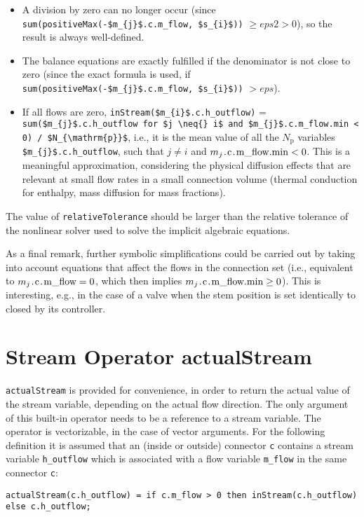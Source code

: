 \begin{nonnormative}
\begin{itemize}
\item
  A division by zero can no longer occur (since \lstinline[mathescape=true]!sum(positiveMax(-$m_{j}$.c.m_flow, $s_{i}$))! $\geq \mathit{eps2} > 0$),
  so the result is always well-defined.
\item
  The balance equations are exactly fulfilled if the denominator is not close to zero (since the exact formula is used, if
  \lstinline[mathescape=true]!sum(positiveMax(-$m_{j}$.c.m_flow, $s_{i}$))! $> \mathit{eps}$).
\item
  If all flows are zero,
  \lstinline[mathescape=true]!inStream($m_{i}$.c.h_outflow)! =
  \lstinline[mathescape=true]!sum($m_{j}$.c.h_outflow for $j \neq{} i$ and $m_{j}$.c.m_flow.min < 0) / $N_{\mathrm{p}}$!,
  i.e., it is the mean value of all the $N_{\mathrm{p}}$ variables
  \lstinline[mathescape=true]!$m_{j}$.c.h_outflow!, such that $j \neq i$ and
  $m_{j}\text{\lstinline!.c.m_flow.min!} < 0$. This is a
  meaningful approximation, considering the physical diffusion effects
  that are relevant at small flow rates in a small connection volume
  (thermal conduction for enthalpy, mass diffusion for mass fractions).
\end{itemize}

The value of \lstinline!relativeTolerance! should be larger than the relative
tolerance of the nonlinear solver used to solve the implicit algebraic
equations.

As a final remark, further symbolic simplifications could be
carried out by taking into account equations that affect the flows in
the connection set (i.e., equivalent to $m_{j}\text{\lstinline!.c.m_flow!} =
0$, which then implies $m_{j}\text{\lstinline!.c.m_flow.min!} \geq 0$). This is interesting, e.g., in the case of a valve when the stem
position is set identically to closed by its controller.
\end{nonnormative}

\section{Stream Operator actualStream}

\lstinline!actualStream! is provided for convenience, in
order to return the actual value of the stream variable, depending on
the actual flow direction. The only argument of this built-in operator
needs to be a reference to a stream variable. The operator is
vectorizable, in the case of vector arguments. For the following
definition it is assumed that an (inside or outside) connector \lstinline!c!
contains a stream variable \lstinline!h_outflow! which is associated with a flow
variable \lstinline!m_flow! in the same connector \lstinline!c!:
\begin{lstlisting}[language=modelica]
actualStream(c.h_outflow) = if c.m_flow > 0 then inStream(c.h_outflow) else c.h_outflow;
\end{lstlisting}

